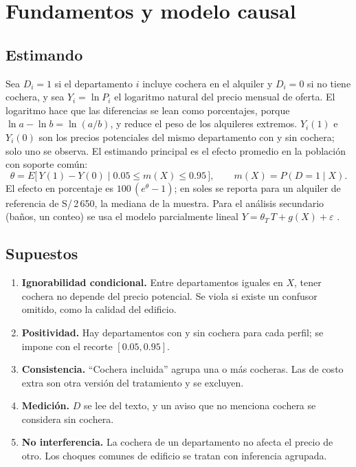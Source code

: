 \chapter{Fundamentos y modelo causal}\label{cap:marco}

\section{Estimando}

Sea $D_i=1$ si el departamento $i$ incluye cochera en el alquiler y $D_i=0$ si no tiene cochera, y sea $Y_i=\ln P_i$ el logaritmo natural del precio mensual de oferta. El logaritmo hace que las diferencias se lean como porcentajes, porque $\ln a-\ln b=\ln(a/b)$, y reduce el peso de los alquileres extremos. $Y_i(1)$ e $Y_i(0)$ son los precios potenciales del mismo departamento con y sin cochera; solo uno se observa. El estimando principal es el efecto promedio en la población con soporte común:
\begin{equation}\label{eq:ate}
\theta = E\big[\,Y(1)-Y(0)\;\big|\;0.05\le m(X)\le0.95\,\big],\qquad m(X)=P(D=1\mid X).
\end{equation}
El efecto en porcentaje es $100\,(e^\theta-1)$; en soles se reporta para un alquiler de referencia de S/\,2\,650, la mediana de la muestra. Para el análisis secundario (baños, un conteo) se usa el modelo parcialmente lineal $Y=\theta_T\,T+g(X)+\varepsilon$ \citep{robinson1988}.

\section{Supuestos}

\begin{enumerate}[leftmargin=*,itemsep=1pt]
\item \textbf{Ignorabilidad condicional.} Entre departamentos iguales en $X$, tener cochera no depende del precio potencial. Se viola si existe un confusor omitido, como la calidad del edificio.
\item \textbf{Positividad.} Hay departamentos con y sin cochera para cada perfil; se impone con el recorte $[0.05,0.95]$.
\item \textbf{Consistencia.} ``Cochera incluida'' agrupa una o más cocheras. Las de costo extra son otra versión del tratamiento y se excluyen.
\item \textbf{Medición.} $D$ se lee del texto, y un aviso que no menciona cochera se considera sin cochera.
\item \textbf{No interferencia.} La cochera de un departamento no afecta el precio de otro. Los choques comunes de edificio se tratan con inferencia agrupada.
\end{enumerate}

